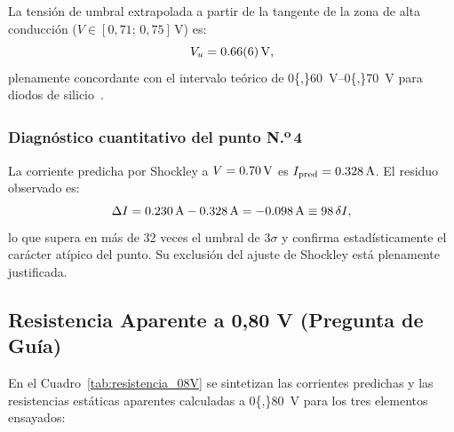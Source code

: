 La tensión de umbral extrapolada a partir de la tangente de la zona de alta conducción ($V \in [0{,}71;\,0{,}75]\,\unit{\volt}$) es:
\begin{equation}
    V_u = \qty{0{,}66 \pm 0{,}06}{\volt},
\end{equation}
plenamente concordante con el intervalo teórico de \qtyrange{0{,}60}{0{,}70}{\volt} para diodos de silicio~\cite{boylestad}.

\subsubsection{Diagnóstico cuantitativo del punto \texorpdfstring{N.\textsuperscript{o}\,4}{Nro. 4}}
La corriente predicha por Shockley a $V = \qty{0{,}70}{\volt}$ es $I_{\text{pred}} = \qty{0{,}328}{\ampere}$. El residuo observado es:
\begin{equation}
    \Delta I = \qty{0{,}230}{\ampere} - \qty{0{,}328}{\ampere} = \qty{-0{,}098}{\ampere} \equiv 98\,\delta I,
\end{equation}
lo que supera en más de 32 veces el umbral de 3$\sigma$ y confirma estadísticamente el carácter atípico del punto. Su exclusión del ajuste de Shockley está plenamente justificada.

\subsection{Resistencia Aparente a \texorpdfstring{0{,}80 V}{0,80 V} (Pregunta de Guía)}
En el Cuadro~\ref{tab:resistencia_08V} se sintetizan las corrientes predichas y las resistencias estáticas aparentes calculadas a \qty{0{,}80}{\volt} para los tres elementos ensayados:

\begin{table}[H]
    \centering
    \caption{Corriente y resistencia estática aparente evaluadas a \qty{0{,}80}{\volt} para los tres elementos.}
    \label{tab:resistencia_08V}
\end{table}
